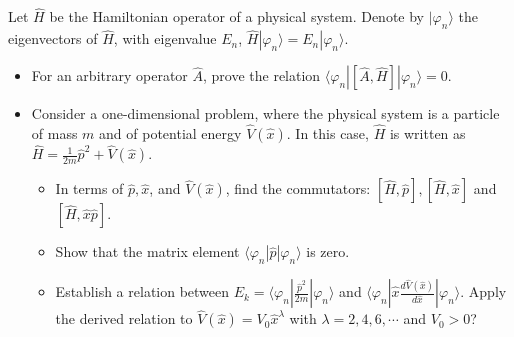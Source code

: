 \documentclass[12pt,a4paper]{article}
\newenvironment{problem}[2][Problem]{\begin{trivlist}
\item[\hskip \labelsep {\bfseries #1}\hskip \labelsep {\bfseries #2.}]}{\end{trivlist}}
\begin{document}
\begin{problem}{4}
[C-T Exercise 2-9] Let $\hat{H}$  be the Hamiltonian operator of a physical system. Denote by $|\varphi_n\rangle$ the eigenvectors of $\hat{H}$, with eigenvalue $E_n$, $\hat{H}|\varphi_n\rangle=E_n|\varphi_n\rangle$.
\begin{itemize}
\item[(a)] For an arbitrary operator $\hat{A}$, prove the relation $\langle\varphi_n|[\hat{A},\hat{H}]|\varphi_n\rangle=0$.
\item[(b)] Consider a one-dimensional problem, where the physical system is a particle of mass $m$ and of potential energy $\hat{V}(\hat{x})$. In this case, $\hat{H}$ is written as $\hat{H}=\frac{1}{2m}\hat{p}^2+\hat{V}(\hat{x})$.
\begin{itemize}
\item[i.] In terms of $\hat{p},\hat{x}$, and $\hat{V}(\hat{x})$, find the commutators: $[\hat{H},\hat{p}],[\hat{H},\hat{x}]$ and $[\hat{H},\hat{x}\hat{p}]$.
\item[ii.] Show that the matrix element $\langle\varphi_n|\hat{p}|\varphi_n\rangle$ is zero.
\item[iii.] Establish a relation between $E_k=\langle\varphi_n|\frac{\hat{p}^2}{2m}|\varphi_n\rangle$ and $\langle\varphi_n|\hat{x}\frac{d\hat{V}(\hat{x})}{d\hat{x}}|\varphi_n\rangle$. Apply the derived relation to $\hat{V}(\hat{x})=V_0\hat{x}^{\lambda}$ with $\lambda=2,4,6,\cdots$ and $V_0>0$?
\end{itemize}
\end{itemize}
\end{problem}
\end{document}
